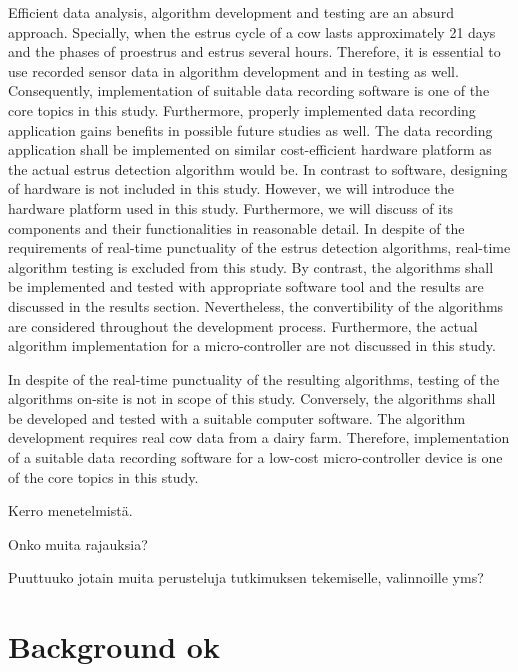 \documentclass[english,12pt,a4paper,pdftex,elec,utf8]{aaltothesis}
\begin{document}
Efficient data analysis, algorithm development and testing are an absurd approach. Specially, when the estrus cycle of a cow lasts approximately 21 days and the phases of proestrus and estrus several hours. Therefore, it is essential to use recorded sensor data in algorithm development and in testing as well. Consequently, implementation of suitable data recording software is one of the core topics in this study. Furthermore, properly implemented data recording application gains benefits in possible future studies as well. The data recording application shall be implemented on similar cost-efficient hardware platform as the actual estrus detection algorithm would be. In contrast to software, designing of hardware is not included in this study. However, we will introduce the hardware platform used in this study. Furthermore, we will discuss of its components and their functionalities in reasonable detail. In despite of the requirements of real-time punctuality of the estrus detection algorithms, real-time algorithm testing is excluded from this study. By contrast, the algorithms shall be implemented and tested with appropriate software tool and the results are discussed in the results section. Nevertheless, the convertibility of the algorithms are considered throughout the development process. Furthermore, the actual algorithm implementation for a micro-controller are not discussed in this study.


In despite of the real-time punctuality of the resulting algorithms, testing of the algorithms on-site is not in scope of this study. Conversely, the algorithms shall be developed and tested with a suitable computer software. The algorithm development requires real cow data from a dairy farm. Therefore, implementation of a suitable data recording software for a low-cost micro-controller device is one of the core topics in this study. 


Kerro menetelmistä.

Onko muita rajauksia?

Puuttuuko jotain muita perusteluja tutkimuksen tekemiselle, valinnoille yms?



\clearpage 

\section{Background ok} \label{backgroundsection}
 
\end{document}
